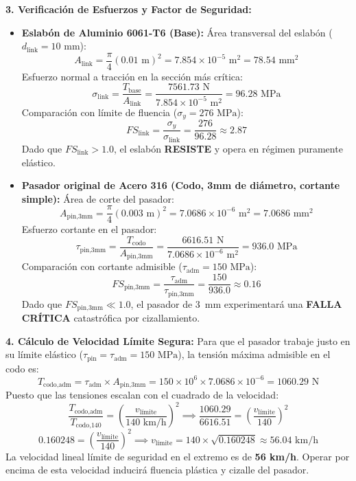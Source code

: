 \documentclass[11pt,a4paper]{article}
\begin{document}
\textbf{3. Verificación de Esfuerzos y Factor de Seguridad:}
\begin{itemize}
    \item \textbf{Eslabón de Aluminio 6061-T6 (Base):}
    Área transversal del eslabón ($d_{\text{link}} = 10\text{ mm}$):
    $$A_{\text{link}} = \frac{\pi}{4}(0.01\text{ m})^2 = 7.854 \times 10^{-5}\text{ m}^2 = 78.54\text{ mm}^2$$
    Esfuerzo normal a tracción en la sección más crítica:
    $$\sigma_{\text{link}} = \frac{T_{\text{base}}}{A_{\text{link}}} = \frac{7561.73\text{ N}}{7.854 \times 10^{-5}\text{ m}^2} = 96.28\text{ MPa}$$
    Comparación con límite de fluencia ($\sigma_y = 276\text{ MPa}$):
    $$FS_{\text{link}} = \frac{\sigma_y}{\sigma_{\text{link}}} = \frac{276}{96.28} \approx 2.87$$
    Dado que $FS_{\text{link}} > 1.0$, el eslabón \textbf{RESISTE} y opera en régimen puramente elástico.
    
    \item \textbf{Pasador original de Acero 316 (Codo, 3mm de diámetro, cortante simple):}
    Área de corte del pasador:
    $$A_{\text{pin,3mm}} = \frac{\pi}{4}(0.003\text{ m})^2 = 7.0686 \times 10^{-6}\text{ m}^2 = 7.0686\text{ mm}^2$$
    Esfuerzo cortante en el pasador:
    $$\tau_{\text{pin,3mm}} = \frac{T_{\text{codo}}}{A_{\text{pin,3mm}}} = \frac{6616.51\text{ N}}{7.0686 \times 10^{-6}\text{ m}^2} = 936.0\text{ MPa}$$
    Comparación con cortante admisible ($\tau_{\text{adm}} = 150\text{ MPa}$):
    $$FS_{\text{pin,3mm}} = \frac{\tau_{\text{adm}}}{\tau_{\text{pin,3mm}}} = \frac{150}{936.0} \approx 0.16$$
    Dado que $FS_{\text{pin,3mm}} \ll 1.0$, el pasador de 3~mm experimentará una \textbf{FALLA CRÍTICA} catastrófica por cizallamiento.
\end{itemize}

\textbf{4. Cálculo de Velocidad Límite Segura:}
Para que el pasador trabaje justo en su límite elástico ($\tau_{\text{pin}} = \tau_{\text{adm}} = 150\text{ MPa}$), la tensión máxima admisible en el codo es:
$$T_{\text{codo,adm}} = \tau_{\text{adm}} \times A_{\text{pin,3mm}} = 150 \times 10^6 \times 7.0686 \times 10^{-6} = 1060.29\text{ N}$$
Puesto que las tensiones escalan con el cuadrado de la velocidad:
$$\frac{T_{\text{codo,adm}}}{T_{\text{codo,140}}} = \left(\frac{v_{\text{límite}}}{140\text{ km/h}}\right)^2 \implies \frac{1060.29}{6616.51} = \left(\frac{v_{\text{límite}}}{140}\right)^2$$
$$0.160248 = \left(\frac{v_{\text{límite}}}{140}\right)^2 \implies v_{\text{límite}} = 140 \times \sqrt{0.160248} \approx 56.04\text{ km/h}$$
La velocidad lineal límite de seguridad en el extremo es de \textbf{56 km/h}. Operar por encima de esta velocidad inducirá fluencia plástica y cizalle del pasador.
\end{document}
